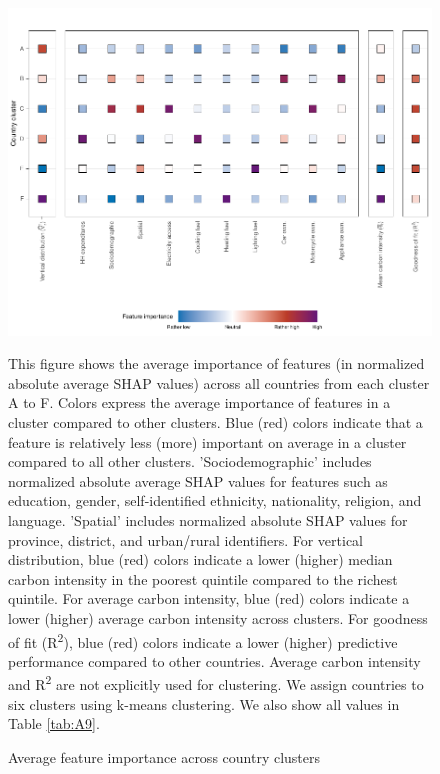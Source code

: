 \documentclass[12pt, a4paper]{article}
\newenvironment{subcaption2}
{\strut
\vspace{-5pt}
\begin{minipage}[b]{0.95\textwidth}
  \hspace*{-\parindent}
  \footnotesize}
 {\end{minipage}}
\begin{document}
\begin{figure}[ht!]
    \centering
    \includegraphics{1_Figures/Figure 3/Figure_3_Corrected.pdf}
    \caption{Average feature importance across country clusters}
    \label{fig:fig_3}
    \begin{subcaption2}
    This figure shows the average importance of features (in normalized absolute average SHAP values) across all countries from each cluster A to F. Colors express the average importance of features in a cluster compared to other clusters. Blue (red) colors indicate that a feature is relatively less (more) important on average in a cluster compared to all other clusters. 'Sociodemographic' includes normalized absolute average SHAP values for features such as education, gender, self-identified ethnicity, nationality, religion, and language. 'Spatial' includes normalized absolute SHAP values for province, district, and urban/rural identifiers. For vertical distribution, blue (red) colors indicate a lower (higher) median carbon intensity in the poorest quintile compared to the richest quintile. For average carbon intensity, blue (red) colors indicate a lower (higher) average carbon intensity across clusters. For goodness of fit (R\textsuperscript{2}), blue (red) colors indicate a lower (higher) predictive performance compared to other countries. Average carbon intensity and R\textsuperscript{2} are not explicitly used for clustering. We assign countries to six clusters using k-means clustering. We also show all values in Table \ref{tab:A9}.
    \end{subcaption2}
\end{figure}
\end{document}
